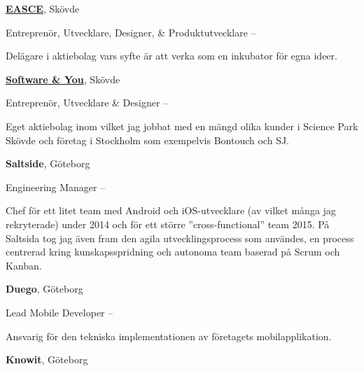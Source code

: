 \documentclass[letterpaper,MMMyyyy,nonstopmode]{resume}
\begin{document}
\begin{Body}
\begin{comment}
\Gap
\BulletItem
Handledare (deltid)
\hfill
\DatestampYMD{2006}{01}{01} --
\DatestampYMD{2006}{06}{01}
\begin{Detail}
\SubBulletItem
Vidareutveckling, handledning och rättning av projekt i mjukvarutveckling
\end{Detail}
\end{comment}

\BigGap
\Entry
\href{http://easce.com/}
{\textbf{EASCE}}, Skövde

\Gap
\BulletItem
Entreprenör, Utvecklare, Designer, \& Produktutvecklare
\hfill
{} --
\begin{Detail}
\SubBulletItem
Delägare i aktiebolag vars syfte är att verka som en inkubator för egna ideer. 
\end{Detail}

\BigGap
\Entry
\href{http://softwareyou.se/}
{\textbf{Software \& You}}, Skövde

\Gap
\BulletItem
Entreprenör, Utvecklare \& Designer
\hfill
{} --
\begin{Detail}
\SubBulletItem
Eget aktiebolag inom vilket jag jobbat med en mängd olika kunder i Science Park Skövde och företag i Stockholm som exempelvis Bontouch och SJ.
\end{Detail}

\BigGap
\Entry
\textbf{Saltside}, Göteborg

\Gap
\BulletItem
Engineering Manager
\hfill
{} --

\begin{Detail}
\SubBulletItem
Chef för ett litet team med Android och iOS-utvecklare (av vilket många jag rekryterade) under 2014 och för ett större ''cross-functional'' team 2015. På Saltsida tog jag även fram den agila utvecklingsprocess som användes, en process centrerad kring kunskapsspridning och autonoma team baserad på Scrum och Kanban.
\end{Detail}

\BigGap
\Entry
\textbf{Duego}, Göteborg

\Gap
\BulletItem
Lead Mobile Developer
\hfill
{} --

\begin{Detail}
\SubBulletItem
Ansvarig för den tekniska implementationen av företagets mobilapplikation.
\end{Detail}

\BigGap
\Entry
\textbf{Knowit}, Göteborg


\end{Body}
\end{document}
